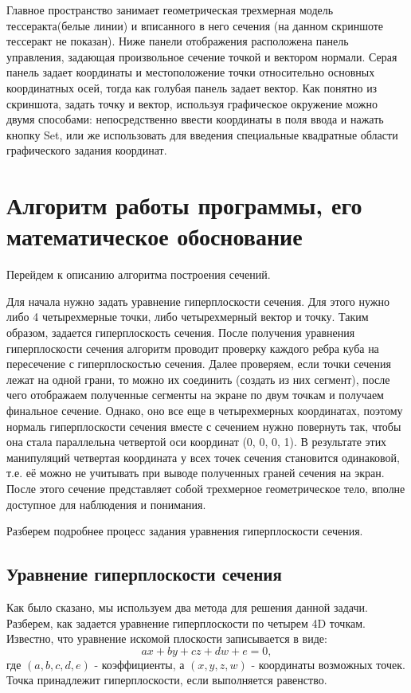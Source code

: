 \documentclass[12pt, a4paper, twoside]{report}
\begin{document}
Главное пространство занимает геометрическая трехмерная модель тессеракта(белые линии) и вписанного в него сечения (на данном скриншоте тессеракт не показан). Ниже панели отображения расположена панель управления, задающая произвольное сечение точкой и вектором нормали. Серая панель задает координаты и местоположение точки относительно основных координатных осей, тогда как голубая панель задает вектор. Как понятно из скриншота, задать точку и вектор, используя графическое окружение можно двумя способами: непосредственно ввести координаты в поля ввода и нажать кнопку Set, или же использовать для введения специальные квадратные области графического задания координат. 

\section{Алгоритм работы программы, его математическое обоснование}
Перейдем к описанию алгоритма построения сечений.

Для начала нужно задать уравнение гиперплоскости сечения. Для этого нужно либо 4 четырехмерные точки, либо четырехмерный вектор и точку. Таким образом, задается гиперплоскость сечения. После получения уравнения гиперплоскости сечения алгоритм проводит проверку каждого ребра куба на пересечение с гиперплоскостью сечения. Далее проверяем, если точки сечения лежат на одной грани, то можно их соединить (создать из них сегмент), после чего отображаем полученные сегменты на экране по двум точкам и получаем финальное сечение. Однако, оно все еще в четырехмерных координатах, поэтому нормаль гиперплоскости сечения вместе с сечением нужно повернуть так, чтобы она стала параллельна четвертой оси координат (0, 0, 0, 1). В результате этих манипуляций четвертая координата у всех точек сечения становится одинаковой, т.е. её можно не учитывать при выводе полученных граней сечения на экран. После этого сечение представляет собой трехмерное геометрическое тело, вполне доступное для наблюдения и понимания.

Разберем подробнее процесс задания уравнения гиперплоскости сечения.
\subsection{Уравнение гиперплоскости сечения}
Как было сказано, мы используем два метода для решения данной задачи. Разберем, как задается уравнение гиперплоскости по четырем 4D точкам.
Известно, что уравнение искомой плоскости записывается в виде:
$$ax + by + cz + dw + e=0,$$ где $(a,b,c,d,e)$ - коэффициенты, а $(x,y,z,w)$ - координаты возможных точек. Точка принадлежит гиперплоскости, если выполняется равенство.
\end{document}
